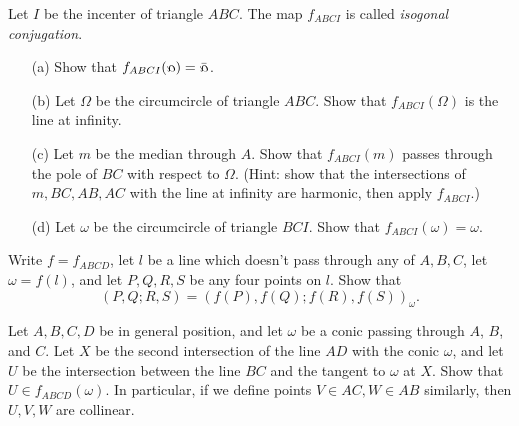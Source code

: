 \begin{exer} Let $I$ be the incenter of triangle $ABC$. The map $f_{ABCI}$ is called \emph{isogonal conjugation}.
\begin{itemize}
\item[(a)] Show that $f_{ABCI}(\fish) = \bar\fish$.

\item[(b)] Let $\Omega$ be the circumcircle of triangle $ABC$. Show that $f_{ABCI}(\Omega)$ is the line at infinity.

\item[(c)] Let $m$ be the median through $A$. Show that $f_{ABCI}(m)$ passes through the pole of $BC$ with respect to $\Omega$. (Hint: show that the intersections of $m, BC, AB, AC$ with the line at infinity are harmonic, then apply $f_{ABCI}$.)

\item[(d)] Let $\omega$ be the circumcircle of triangle $BCI$. Show that $f_{ABCI}(\omega) = \omega$.
\end{itemize}
\end{exer}

\begin{exer}  Write $f = f_{ABCD}$, let $l$ be a line which doesn't pass through any of $A,B,C$, let $\omega = f(l)$, and let $P,Q,R,S$ be any four points on $l$. Show that
\[
(P,Q;R,S) = (f(P),f(Q);f(R),f(S))_\omega.
\]
\end{exer}

\begin{exer} Let $A,B,C,D$ be in general position, and let $\omega$ be a conic passing through $A$, $B$, and $C$. Let $X$ be the second intersection of the line $AD$ with the conic $\omega$, and let $U$ be the intersection between the line $BC$ and the tangent to $\omega$ at $X$. Show that $U \in f_{ABCD}(\omega)$. In particular, if we define points $V \in AC, W \in AB$ similarly, then $U,V,W$ are collinear.
\end{exer}

